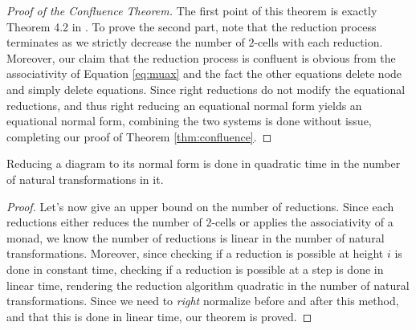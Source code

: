 \begin{proof}[Proof of the Confluence Theorem]
	The first point of this theorem is exactly Theorem 4.2
	in .
	To prove the second part, note that the reduction process terminates as
	we strictly decrease the number of $2$-cells with each reduction.
	Moreover, our claim that the reduction process is confluent is obvious
	from the associativity of Equation \eqref{eq:muax} and the fact the other
	equations delete node and simply delete equations.
	Since right reductions do not modify the equational reductions, and thus
	right reducing an equational normal form yields an equational normal form,
	combining the two systems is done without issue, completing our proof of
	Theorem \ref{thm:confluence}.
\end{proof}


\begin{thm}
	Reducing a diagram to its normal form is done in quadratic time in
	the number of natural transformations in it.
\end{thm}
\begin{proof}
	Let's now give an upper bound on the number of reductions.
	Since each reductions either reduces the number of $2$-cells or applies the
	associativity of a monad, we know the number of reductions is linear in the
	number of natural transformations.
	Moreover, since checking if a reduction is possible at height $i$ is done in
	constant time, checking if a reduction is possible at a step is done in
	linear time, rendering the reduction algorithm quadratic in the number of
	natural transformations.
	Since we need to \emph{right} normalize before and after this method, and
	that this is done in linear time, our theorem is proved.
\end{proof}
